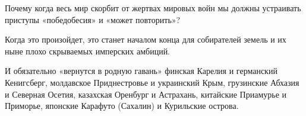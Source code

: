 Почему когда весь мир скорбит от жертвах мировых войн мы должны устраивать
приступы «победобесия» и «может повторить»?

Когда это произойдет, это станет началом конца для собирателей земель и их ныне
плохо скрываемых имперских амбиций. 

И обязательно «вернутся в родную гавань» финская Карелия и германский
Кенигсберг, молдавское Приднестровье и украинский Крым, грузинские Абхазия и
Северная Осетия, казахская Оренбург и Астрахань, китайские Приамурье и
Приморье, японские Карафуто (Сахалин) и Курильские острова.


